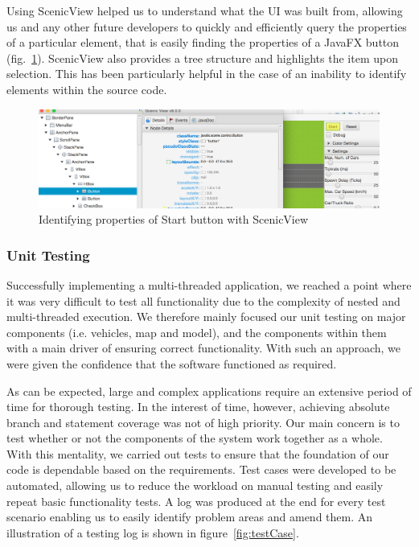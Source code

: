 Using ScenicView helped us to understand what the UI was built from, allowing us and any other future developers to quickly and efficiently query the properties of a particular element, that is easily finding the properties of a JavaFX button (fig.~\ref{fig:scenicview}). ScenicView also provides a tree structure and highlights the item upon selection. This has been particularly helpful in the case of an inability to identify elements within the source code.  
\begin{figure}[h]
	\begin{center}
		\includegraphics[width=\textwidth]{img/scenicView.png}
		\caption[Identifying properties of Start button with ScenicView]{Identifying properties of Start button with ScenicView}
	\label{fig:scenicview}
	\end{center}
\end{figure}

\subsubsection*{Unit Testing}
Successfully implementing a multi-threaded application, we reached a point where it was very difficult to test all functionality due to the complexity of nested and multi-threaded execution. We therefore mainly focused our unit testing on major components (i.e. vehicles, map and model), and the components within them with a main driver of ensuring correct functionality. With such an approach, we were given the confidence that the software functioned as required.

As can be expected, large and complex applications require an extensive period of time for thorough testing. In the interest of time, however, achieving absolute branch and statement coverage was not of high priority. Our main concern is to test whether or not the components of the system work together as a whole.  With this mentality, we carried out tests to ensure that the foundation of our code is dependable based on the requirements. Test cases were developed to be automated, allowing us to reduce the workload on manual testing and easily repeat basic functionality tests. A log was produced at the end for every test scenario enabling us to easily identify problem areas and amend them. An illustration of a testing log is shown in figure~\ref{fig:testCase}. 

